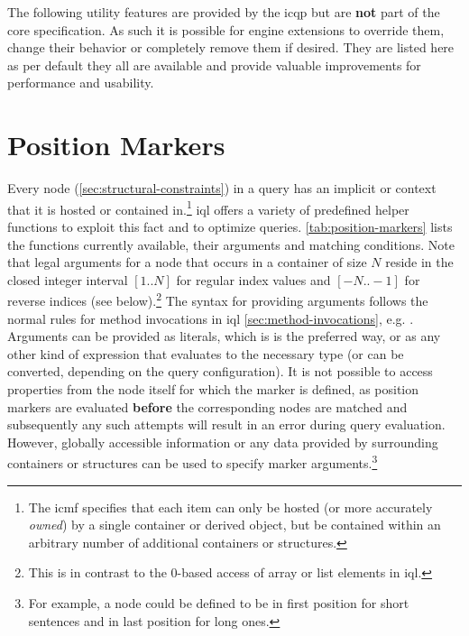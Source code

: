 \documentclass[11pt,a4paper]{report}
\begin{document}
The following utility features are provided by the \ac{icqp} but are \textbf{not} part of the core specification. 
As such it is possible for engine extensions to override them, change their behavior or completely remove them if desired.
They are listed here as per default they all are available and provide valuable improvements for performance and usability.

\section{Position Markers}
\label{sec:position-markers}

Every node (\ref{sec:structural-constraints}) in a query has an implicit  or  context that it is hosted  or contained in.\footnote{The \ac{icmf} specifies that each item can only be hosted (or more accurately \textit{owned}) by a single container or derived object, but be contained within an arbitrary number of additional containers or structures.}
\ac{iql} offers a variety of predefined helper functions  to exploit this fact and to optimize queries.
\cref{tab:position-markers} lists the functions currently available, their arguments and matching conditions.
Note that legal arguments for a node that occurs in a container of size $N$ reside in the closed integer interval $[1..N]$ for regular index values and $[-N..-1]$ for reverse indices (see below).\footnote{This is in contrast to the 0-based access of array or list elements in \ac{iql}.}
The syntax for providing arguments follows the normal rules for method invocations in \ac{iql} \ref{sec:method-invocations}, e.g. .
Arguments can be provided as literals, which is is the preferred way, or as any other kind of expression that evaluates to the necessary type (or can be converted, depending on the query configuration).
It is not possible to access properties from the node itself for which the marker is defined, as position markers are evaluated \textbf{before} the corresponding nodes are matched and subsequently any such attempts will result in an error during query evaluation.
However, globally accessible information or any data provided by surrounding containers or structures can be used to specify marker arguments.\footnote{For example, a node could be defined to be in first position for short sentences and in last position for long ones.}
\end{document}

